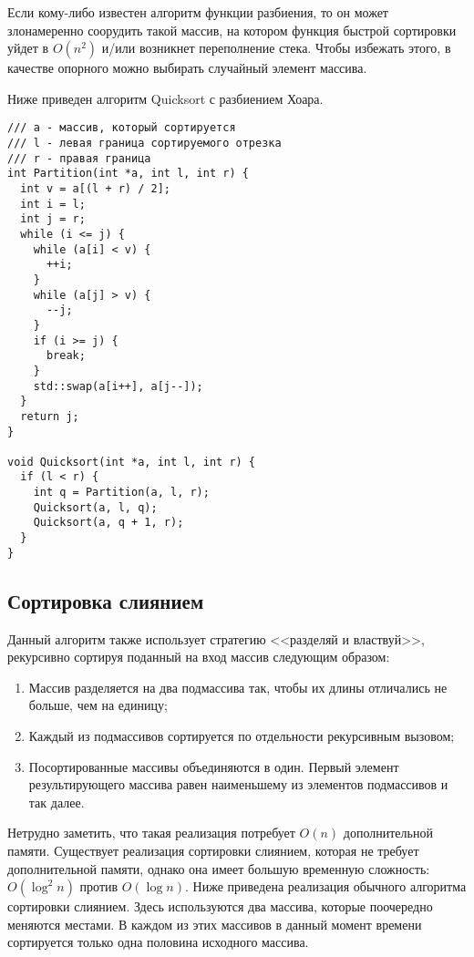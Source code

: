 Если кому-либо известен алгоритм функции разбиения, то он может злонамеренно соорудить
такой массив, на котором функция быстрой сортировки уйдет в $O(n^2)$ и/или возникнет
переполнение стека. Чтобы избежать этого, в качестве опорного можно выбирать случайный
элемент массива.

Ниже приведен алгоритм Quicksort с разбиением Хоара.
\begin{verbatim}
/// a - массив, который сортируется
/// l - левая граница сортируемого отрезка
/// r - правая граница
int Partition(int *a, int l, int r) {
  int v = a[(l + r) / 2];
  int i = l;
  int j = r;
  while (i <= j) {
    while (a[i] < v) {
      ++i;
    }
    while (a[j] > v) {
      --j;
    }
    if (i >= j) {
      break;
    }
    std::swap(a[i++], a[j--]);
  }
  return j;
}

void Quicksort(int *a, int l, int r) {
  if (l < r) {
    int q = Partition(a, l, r);
    Quicksort(a, l, q);
    Quicksort(a, q + 1, r);
  }
}
\end{verbatim}

\subsection{Сортировка слиянием}
Данный алгоритм также использует стратегию <<разделяй и властвуй>>, рекурсивно сортируя
поданный на вход массив следующим образом:
\begin{enumerate}
  \item Массив разделяется на два подмассива так, чтобы их длины отличались не больше,
        чем на единицу;
  \item Каждый из подмассивов сортируется по отдельности рекурсивным вызовом;
  \item Посортированные массивы объединяются в один. Первый элемент результирующего 
        массива равен наименьшему из элементов подмассивов и так далее.
\end{enumerate}

Нетрудно заметить, что такая реализация потребует $O(n)$ дополнительной памяти.
Существует реализация сортировки слиянием, которая не требует дополнительной памяти,
однако она имеет большую временную сложность: $O(\log^2 n)$ против $O(\log n)$.
Ниже приведена реализация обычного алгоритма сортировки слиянием. Здесь используются
два массива, которые поочередно меняются местами. В каждом из этих массивов
в данный момент времени сортируется только одна половина исходного массива.

